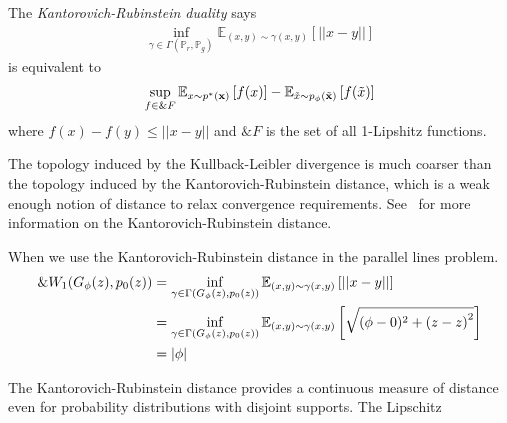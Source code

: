 \begin{theorem} The \textit{Kantorovich-Rubinstein duality} says
  \begin{align}
    \inf_{\gamma \in \Gamma(\mathbb{P}_r,
    \mathbb{P}_g)}\mathbb{E}_{(x,y) \sim \gamma(x, y)} \left[ || x-y
    || \right]
  \end{align}
  is equivalent to
  \begin{align} \sup_{f \in \&{F}} \mathbb{E}_{x \sim p^*(\mathbf{x})}\left[ f(x)
    \right] - \mathbb{E}_{\tilde{x} \sim p_{\phi}(\tilde{\mathbf{x}})}\left[ f(\tilde{x}) \right]
  \end{align}
  where $f(x) - f(y) \leq ||x-y||$ and $\&{F}$ is the set of all
  1-Lipshitz functions.
\end{theorem}

The topology induced by the Kullback-Leibler divergence is much
coarser than the topology induced by the Kantorovich-Rubinstein
distance, which is a weak enough notion of distance to relax
convergence requirements. See~\cite{ref:villani-2008} for more
information on the Kantorovich-Rubinstein distance.

\begin{example}
  When we use the Kantorovich-Rubinstein distance in the parallel
  lines problem.
  \begin{align}
    \&W_1(G_\phi(z), p_0(z)) & = \inf_{\gamma \in
                           \Gamma(G_\phi(z),p_0(z))}\mathbb{E}_{(x,y) \sim
                           \gamma(x, y)} \left[ || x-y || \right] \\
                         & =\inf_{\gamma \in \Gamma(G_\phi(z),
                           p_0(z))}\mathbb{E}_{(x,y) \sim \gamma(x,
                           y)} \left[ \sqrt{(\phi - 0)^2 + {(z - z)}^2}
                           \right] \\
                         & =|\phi|
  \end{align}
\end{example}

The Kantorovich-Rubinstein distance provides a continuous measure of
distance even for probability distributions with disjoint supports.
The Lipschitz

